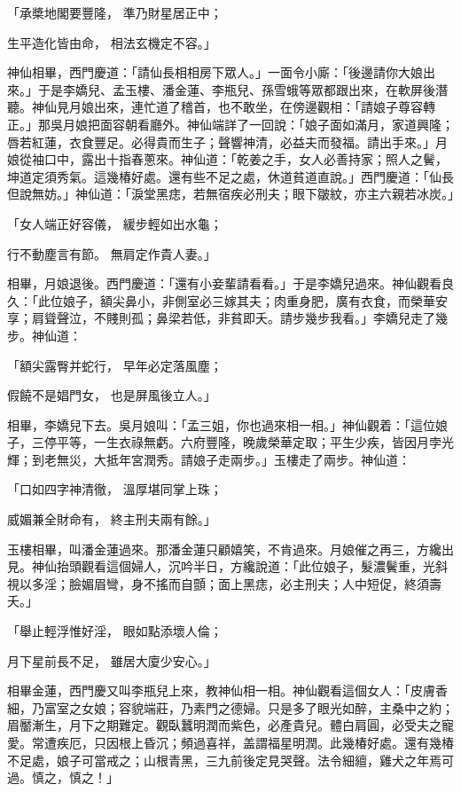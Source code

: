 「承槳地閣要豐隆，  準乃財星居正中；

生平造化皆由命，  相法玄機定不容。」

神仙相畢，西門慶道：「請仙長相相房下眾人。」一面令小廝：「後邊請你大娘出來。」于是李嬌兒、孟玉樓、潘金蓮、李瓶兒、孫雪蛾等眾都跟出來，在軟屏後潛聽。神仙見月娘出來，連忙道了稽首，也不敢坐，在傍邊觀相：「請娘子尊容轉正。」那吳月娘把面容朝看廳外。神仙端詳了一回說：「娘子面如滿月，家道興隆；唇若紅蓮，衣食豐足。必得貴而生子；聲響神清，必益夫而發福。請出手來。」月娘從袖口中，露出十指春蔥來。神仙道：「乾姜之手，女人必善持家；照人之鬢，坤道定須秀氣。這幾椿好處。還有些不足之處，休道貧道直說。」西門慶道：「仙長但說無妨。」神仙道：「淚堂黑痣，若無宿疾必刑夫；眼下皺紋，亦主六親若冰炭。」

「女人端正好容儀，  緩步輕如出水龜；

行不動塵言有節。  無肩定作貴人妻。」

相畢，月娘退後。西門慶道：「還有小妾輩請看看。」于是李嬌兒過來。神仙觀看良久：「此位娘子，額尖鼻小，非側室必三嫁其夫；肉重身肥，廣有衣食，而榮華安享；肩聳聲泣，不賤則孤；鼻梁若低，非貧即夭。請步幾步我看。」李嬌兒走了幾步。神仙道：

「額尖露臀并蛇行，  早年必定落風塵；

假饒不是娼門女，  也是屏風後立人。」

相畢，李嬌兒下去。吳月娘叫：「孟三姐，你也過來相一相。」神仙觀着：「這位娘子，三停平等，一生衣祿無虧。六府豐隆，晚歲榮華定取；平生少疾，皆因月孛光輝；到老無災，大抵年宮潤秀。請娘子走兩步。」玉樓走了兩步。神仙道：

「口如四字神清徹，  溫厚堪同掌上珠；

威媚兼全財命有，  終主刑夫兩有餘。」

玉樓相畢，叫潘金蓮過來。那潘金蓮只顧嬉笑，不肯過來。月娘催之再三，方纔出見。神仙抬頭觀看這個婦人，沉吟半日，方纔說道：「此位娘子，髮濃鬢重，光斜視以多淫；臉媚眉彎，身不搖而自顫；面上黑痣，必主刑夫；人中短促，終須壽夭。」

「舉止輕浮惟好淫，  眼如點添壞人倫；

月下星前長不足，  雖居大廈少安心。」

相畢金蓮，西門慶又叫李瓶兒上來，教神仙相一相。神仙觀看這個女人：「皮膚香細，乃富室之女娘；容貌端莊，乃素門之德婦。只是多了眼光如醉，主桑中之約；眉靨漸生，月下之期難定。觀臥蠶明潤而紫色，必產貴兒。體白肩圓，必受夫之寵愛。常遭疾厄，只因根上昏沉；頻過喜祥，盖謂福星明潤。此幾椿好處。還有幾椿不足處，娘子可當戒之；山根青黑，三九前後定見哭聲。法令細繵，雞犬之年焉可過。慎之，慎之！」

